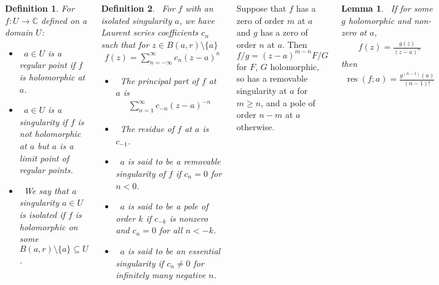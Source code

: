\documentclass{tikzposter} %
\DeclareMathOperator{\res}{res}
\newtheorem{lemma}[theorem]{Lemma}
\newtheorem{definition}{Definition}
\begin{document}
\begin{columns}
{    \begin{definition}
      For $f : U \to \mathbb{C}$ defined on a domain $U$:
      \begin{itemize}
        \item \ $a \in U$ is a regular point if $f$ is holomorphic at $a$.
        \item \ $a \in U$ is a singularity if $f$ is not holomorphic at $a$ but $a$ is a limit point of regular points.
        \item \ We say that a singularity $a \in U$ is isolated if $f$ is holomorphic on some $B(a,r) \setminus \{a\} \subseteq U$.
      \end{itemize}
    \end{definition}
    \hphantom{}

    \begin{definition}
    \ For $f$ with an isolated singularity $a$, we have Laurent series coefficients $c_{n}$ such that for $z \in B(a,r) \setminus \{a\}$
      \begin{align*}
        f(z) = \sum_{n=-\infty}^{\infty} c_{n}(z-a)^{n}
      \end{align*}
      \begin{itemize}
        \item \ The principal part of $f$ at $a$ is
              \begin{align*}
                \sum_{n=1}^{\infty} c_{-n}(z-a)^{-n}
              \end{align*}
        \item \ The residue of $f$ at $a$ is $c_{-1}$.
        \item \ $a$ is said to be a removable singularity of $f$ if $c_{n} = 0$ for $n < 0$.
        \item \ $a$ is said to be a pole of order $k$ if $c_{-k}$ is nonzero and $c_{n} = 0$ for all $n < -k$.
        \item \ $a$ is said to be an essential singularity if $c_{n} \neq 0$ for infinitely many negative $n$.
      \end{itemize}
    \end{definition}
    \hphantom{}

    Suppose that $f$ has a zero of order $m$ at $a$ and $g$ has a zero of order $n$ at $a$. Then $f / g = (z-a)^{m-n} F / G$ for $F$, $G$ holomorphic, so has a removable singularity at $a$ for $m \ge n$, and a pole of order $n-m$ at $a$ otherwise. \\

    \begin{lemma}
    \ If for some $g$ holomorphic and non-zero at $a$,
      \begin{align*}
        f(z) = \frac{g(z)}{(z-a)^{n}}
      \end{align*}
      then
      \begin{align*}
        \res(f;a) = \frac{g^{(n-1)}(a)}{(n-1)!}
      \end{align*}
    \end{lemma}
    \hphantom{}

}
\end{columns}
\end{document}
